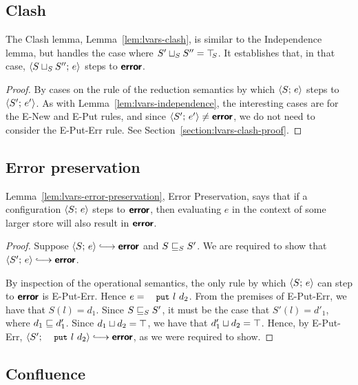 \subsection{Clash}

The Clash lemma, Lemma~\ref{lem:lvars-clash}, is similar to the
Independence lemma, but handles the case where $S' \sqcup_{S} S'' =
\top\hspace{-0.85mm}_{S}$.  It establishes that, in that case,
$\langle S \sqcup_{S} S'';\, e \rangle$ steps to $\textbf{\textsf{error}}$.

\LVarsLemClash
\ifdefined\DISSERTATION
\begin{proof}
  By cases on the rule of the reduction semantics by which
  $\langle S;\, e \rangle$ steps to $\langle S';\, e' \rangle$. As with
  Lemma~\ref{lem:lvars-independence}, the interesting cases are for
  the {\sc E-New} and {\sc E-Put} rules, and since $\langle S';\, e' \rangle
  \neq \textbf{\textsf{error}}$, we do not need to consider the {\sc E-Put-Err} rule.
  See Section~\ref{section:lvars-clash-proof}.
\end{proof}
\fi

\subsection{Error preservation}

Lemma~\ref{lem:lvars-error-preservation}, Error Preservation, says
that if a configuration $\langle S;\, e \rangle$ steps to $\textbf{\textsf{error}}$, then
evaluating $e$ in the context of some larger store will also result in
$\textbf{\textsf{error}}$.

\LVarsLemErrorPreservation
\ifdefined\DISSERTATION
\begin{proof}
  Suppose $\config{S}{e} \parstepsto \error$ and
  $S \sqsubseteq_S S'$. We are required to show that $\config{S'}{e}
  \parstepsto \error$.

  By inspection of the operational semantics, the only rule by which
  $\langle S;\, e \rangle$ can step to $\textbf{\textsf{error}}$ is {\sc E-Put-Err}.  Hence $e =
  \putexp{l}{d_2}$.  From the premises of {\sc E-Put-Err}, we have
  that $S(l) = d_1$.  Since $S \sqsubseteq_S S'$, it must be the case
  that $S'(l) = d'_1$, where $d_1 \sqsubseteq d'_1$.  Since
  $d_1 \sqcup d_2 = \top$, we have that $d'_1 \sqcup d_2 =
  \top$.  Hence, by {\sc E-Put-Err}, $\config{S'}{\putexp{l}{d_2}}
  \parstepsto \error$, as we were required to show.
\end{proof}
\fi

\subsection{Confluence}\label{subsection:lvars-confluence}

